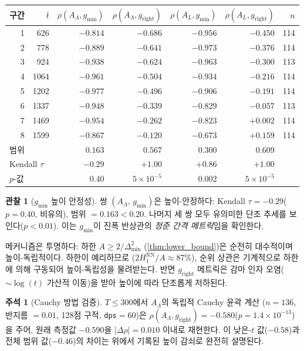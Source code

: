 \documentclass[11pt,a4paper]{article}
\theoremstyle{plain}
\theoremstyle{definition}
\newtheorem{remark}[theorem]{주석}
\newtheorem{observation}[theorem]{관찰}
\newcommand{\La}{\Lambda}
\begin{document}
\begin{center}
\begin{tabular}{rrrrrrr}
\toprule
구간 & $\bar{t}$ & $\rho(A_\La, g_{\min})$ &
$\rho(A_\La, g_{\mathrm{right}})$ &
$\rho(A_L, g_{\min})$ &
$\rho(A_L, g_{\mathrm{right}})$ & $n$ \\
\midrule
1 & 626  & $-0.814$ & $-0.686$ & $-0.956$ & $-0.450$ & 114 \\
2 & 778  & $-0.889$ & $-0.641$ & $-0.973$ & $-0.376$ & 114 \\
3 & 924  & $-0.938$ & $-0.624$ & $-0.963$ & $-0.300$ & 113 \\
4 & 1064 & $-0.961$ & $-0.504$ & $-0.934$ & $-0.216$ & 114 \\
5 & 1202 & $-0.977$ & $-0.496$ & $-0.906$ & $-0.191$ & 114 \\
6 & 1337 & $-0.948$ & $-0.339$ & $-0.829$ & $-0.057$ & 113 \\
7 & 1469 & $-0.954$ & $-0.262$ & $-0.823$ & $+0.002$ & 114 \\
8 & 1599 & $-0.867$ & $-0.120$ & $-0.673$ & $+0.159$ & 114 \\
\midrule
\multicolumn{2}{l}{범위} & $0.163$ & $0.567$ & $0.300$ & $0.609$ & \\
\multicolumn{2}{l}{Kendall $\tau$} & $-0.29$ & $+1.00$ & $+0.86$ & $+1.00$ & \\
\multicolumn{2}{l}{$p$-값} & $0.40$ & $5\!\times\!10^{-5}$ & $0.002$ & $5\!\times\!10^{-5}$ & \\
\bottomrule
\end{tabular}
\end{center}

\begin{observation}[$g_{\min}$ 높이 안정성]\label{obs:stability}
쌍 $(\!A_\La,\, g_{\min}\!)$은 높이-안정하다:
Kendall $\tau = -0.29$($p = 0.40$, 비유의),
범위 $= 0.163 < 0.20$.
나머지 세 쌍 모두 유의미한 단조 추세를 보인다($p < 0.01$).
이는 $g_{\min}$이 진폭 반상관의 \emph{정준 간격 메트릭}임을 확인한다.
\end{observation}

메커니즘은 투명하다: 하한
$A \ge 2/\Delta_{\min}^2$ (\cref{thm:lower_bound})은 순전히 대수적이며
높이-독립적이다. 하한이 예리하므로
($2H_1^{\mathrm{NN}}/A \approx 87\%$), 순위 상관은
기계적으로 하한에 의해 구동되어 높이-독립성을 물려받는다.
반면 $g_{\mathrm{right}}$ 메트릭은
감마 인자 오염($\sim \log(t)$ 가산적 이동)을 받아
높이에 따라 단조롭게 저하된다.

\begin{remark}[Cauchy 방법 검증]
$T \le 300$에서 $A_\La$의 독립적 Cauchy 윤곽 계산
($n = 136$, 반지름 $= 0.01$, 128점 구적,
\texttt{dps}$= 60$)은
$\rho(A_\La, g_{\mathrm{right}}) = -0.580$($p = 1.4 \times 10^{-13}$)을 주어,
원래 측정값 $-0.590$을 $|\Delta\rho| = 0.010$ 이내로 재현한다.
이 낮은-$t$ 값($-0.58$)과 전체 범위 값($-0.46$)의 차이는
위에서 기록된 높이 감쇠로 완전히 설명된다.
\end{remark}
\end{document}
